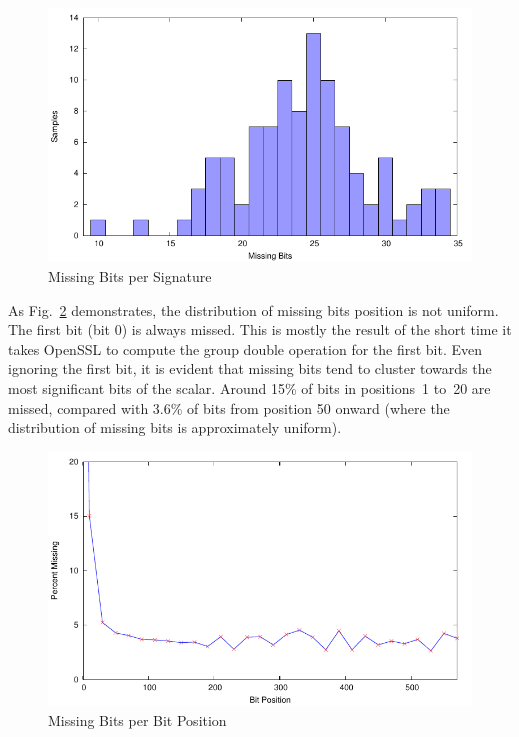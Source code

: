 \documentclass[twocolumn]{svjour3}
\begin{document}
\begin{figure}[htb]
\includegraphics[width=\columnwidth]{images/missing}
\caption{Missing Bits per Signature\label{dgm:dist}}
\end{figure}

As Fig.~\ref{dgm:missed} demonstrates, the distribution of missing bits position is not uniform.
The first bit (bit 0) is always missed.
This is mostly the result of the short time it takes OpenSSL to compute the group double operation for the first bit.
Even ignoring the first bit, it is evident that missing bits tend to cluster towards the most significant bits of the
scalar.
Around 15\% of bits in positions~1 to~20 are missed, compared with 3.6\% of bits from position 50 onward (where the distribution of missing bits is approximately uniform).

\begin{figure}[htb]
\includegraphics[width=\columnwidth]{images/positions}
\caption{Missing Bits per Bit Position\label{dgm:missed}}
\end{figure}
\end{document}
